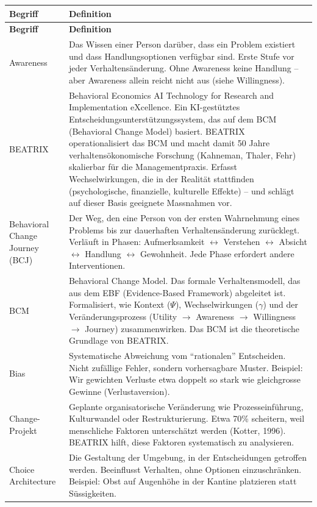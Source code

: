 \documentclass[11pt,a4paper]{article}
\begin{document}
\begin{longtable}{@{}L{4cm}L{10cm}@{}}
\toprule
\textbf{Begriff} & \textbf{Definition} \\
\midrule
\endfirsthead
\toprule
\textbf{Begriff} & \textbf{Definition} \\
\midrule
\endhead

Awareness & Das Wissen einer Person darüber, dass ein Problem existiert und dass Handlungsoptionen verfügbar sind. Erste Stufe vor jeder Verhaltensänderung. Ohne Awareness keine Handlung -- aber Awareness allein reicht nicht aus (siehe Willingness). \\
\midrule
BEATRIX & Behavioral Economics AI Technology for Research and Implementation eXcellence. Ein KI-gestütztes Entscheidungsunterstützungssystem, das auf dem BCM (Behavioral Change Model) basiert. BEATRIX operationalisiert das BCM und macht damit 50 Jahre verhaltensökonomische Forschung (Kahneman, Thaler, Fehr) skalierbar für die Managementpraxis. Erfasst Wechselwirkungen, die in der Realität stattfinden (psychologische, finanzielle, kulturelle Effekte) -- und schlägt auf dieser Basis geeignete Massnahmen vor. \\
\midrule
Behavioral Change Journey (BCJ) & Der Weg, den eine Person von der ersten Wahrnehmung eines Problems bis zur dauerhaften Verhaltensänderung zurücklegt. Verläuft in Phasen: Aufmerksamkeit $\leftrightarrow$ Verstehen $\leftrightarrow$ Absicht $\leftrightarrow$ Handlung $\leftrightarrow$ Gewohnheit. Jede Phase erfordert andere Interventionen. \\
\midrule
BCM & Behavioral Change Model. Das formale Verhaltensmodell, das aus dem EBF (Evidence-Based Framework) abgeleitet ist. Formalisiert, wie Kontext ($\Psi$), Wechselwirkungen ($\gamma$) und der Veränderungsprozess (Utility $\rightarrow$ Awareness $\rightarrow$ Willingness $\rightarrow$ Journey) zusammenwirken. Das BCM ist die theoretische Grundlage von BEATRIX. \\
\midrule
Bias & Systematische Abweichung vom ``rationalen'' Entscheiden. Nicht zufällige Fehler, sondern vorhersagbare Muster. Beispiel: Wir gewichten Verluste etwa doppelt so stark wie gleichgrosse Gewinne (Verlustaversion). \\
\midrule
Change-Projekt & Geplante organisatorische Veränderung wie Prozesseinführung, Kulturwandel oder Restrukturierung. Etwa 70\% scheitern, weil menschliche Faktoren unterschätzt werden (Kotter, 1996). BEATRIX hilft, diese Faktoren systematisch zu analysieren. \\
\midrule
Choice Architecture & Die Gestaltung der Umgebung, in der Entscheidungen getroffen werden. Beeinflusst Verhalten, ohne Optionen einzuschränken. Beispiel: Obst auf Augenhöhe in der Kantine platzieren statt Süssigkeiten. \\

\end{longtable}
\end{document}
